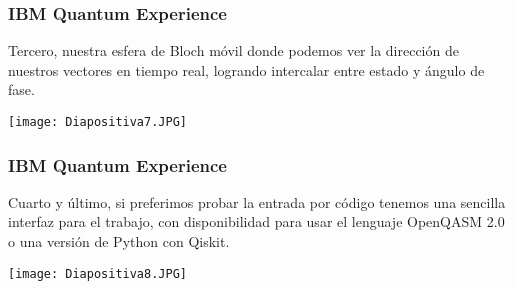 \documentclass[spanish]{beamer}
\begin{document}
  \newpage\justify \begin{frame}
 \frametitle{IBM Quantum Experience} 
 Tercero, nuestra esfera de Bloch móvil donde podemos ver la dirección de nuestros vectores en tiempo real, logrando intercalar entre estado y ángulo de fase.
 
 \centering\texttt{[image: Diapositiva7.JPG]}
 \end{frame}
 
 \newpage\justify \begin{frame}
 \frametitle{IBM Quantum Experience} 
Cuarto y último, si preferimos probar la entrada por código tenemos una sencilla interfaz para el trabajo, con disponibilidad para usar el lenguaje OpenQASM 2.0 o una versión de Python con Qiskit.
 
 \centering\texttt{[image: Diapositiva8.JPG]}
 \end{frame}
 
\end{document}
